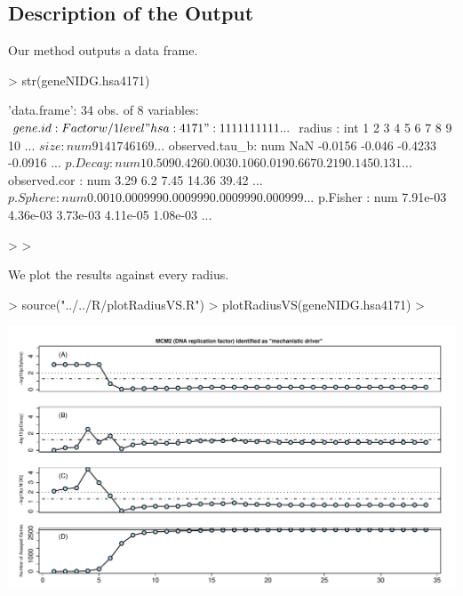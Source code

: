 \documentclass[11pt]{article}
\begin{document}
\subsection*{Description of the Output} %



Our method outputs a data frame. 


\begin{Schunk}
\begin{Sinput}
> str(geneNIDG.hsa4171)
\end{Sinput}
\begin{Soutput}
'data.frame':	34 obs. of  8 variables:
 $ gene.id       : Factor w/ 1 level "hsa:4171": 1 1 1 1 1 1 1 1 1 1 ...
 $ radius        : int  1 2 3 4 5 6 7 8 9 10 ...
 $ size          : num  9 14 17 46 169 ...
 $ observed.tau_b: num  NaN -0.0156 -0.046 -0.4233 -0.0916 ...
 $ p.Decay       : num  1 0.509 0.426 0.003 0.106 0.019 0.667 0.219 0.145 0.131 ...
 $ observed.cor  : num  3.29 6.2 7.45 14.36 39.42 ...
 $ p.Sphere      : num  0.001 0.000999 0.000999 0.000999 0.000999 ...
 $ p.Fisher      : num  7.91e-03 4.36e-03 3.73e-03 4.11e-05 1.08e-03 ...
\end{Soutput}
\begin{Sinput}
> 
> 
\end{Sinput}
\end{Schunk}


We plot the results against every radius.

\begin{Schunk}
\begin{Sinput}
> source("../../R/plotRadiusVS.R")
> plotRadiusVS(geneNIDG.hsa4171)
> 
\end{Sinput}
\end{Schunk}
\includegraphics{vignette-main-010}
\end{document}
